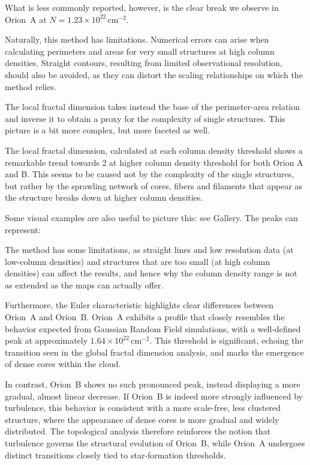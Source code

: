 What is less commonly reported, however, is the clear break we observe in Orion~A at \(N = 1.23 \times 10^{22}\,\mathrm{cm}^{-2}\).

Naturally, this method has limitations.  
Numerical errors can arise when calculating perimeters and areas for very small structures at high column densities.  
Straight contours, resulting from limited observational resolution, should also be avoided, as they can distort the scaling relationships on which the method relies.

The local fractal dimension takes instead the base of the perimeter-area relation and inverse it to obtain a proxy for the complexity of single structures.
This picture is a bit more complex, but more faceted as well. 

The local fractal dimension, calculated at each column density threshold shows a remarkable trend towards 2 at higher column density threshold for both Orion A and B. This seems to be caused not by the complexity of the single structures, but rather by the sprawling network of cores, fibers and filaments that appear as the structure breaks down at higher column densities.

Some visual examples are also useful to picture this: see Gallery. The peaks can represent:

The method has some limitations, as straight lines and low resolution data (at low-column densities) and structures that are too small (at high column densities) can affect the results, and hence why the column density range is not as extended as the maps can actually offer.

Furthermore, the Euler characteristic highlights clear differences between Orion~A and Orion~B.  
Orion~A exhibits a profile that closely resembles the behavior expected from Gaussian Random Field simulations, with a well-defined peak at approximately \(1.64 \times 10^{22}\,\mathrm{cm}^{-2}\).  
This threshold is significant, echoing the transition seen in the global fractal dimension analysis, and marks the emergence of dense cores within the cloud.

In contrast, Orion~B shows no such pronounced peak, instead displaying a more gradual, almost linear decrease.  
If Orion~B is indeed more strongly influenced by turbulence, this behavior is consistent with a more scale-free, less clustered structure, where the appearance of dense cores is more gradual and widely distributed.  
The topological analysis therefore reinforces the notion that turbulence governs the structural evolution of Orion~B, while Orion~A undergoes distinct transitions closely tied to star-formation thresholds.

